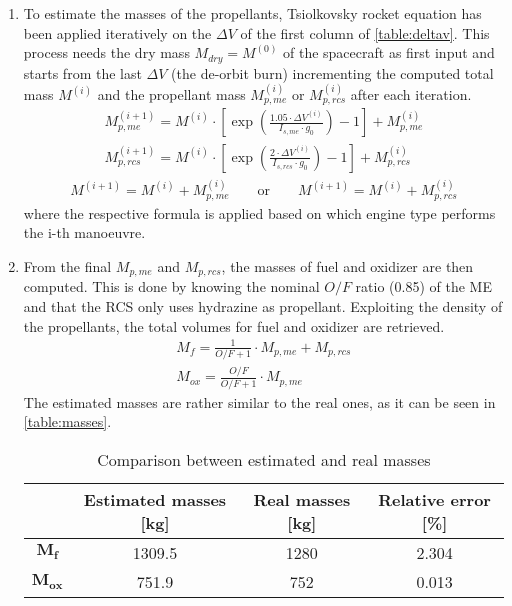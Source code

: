 \begin{enumerate}[itemsep=5mm]
    \item
    To estimate the masses of the propellants, Tsiolkovsky rocket equation has been applied iteratively on the $\Delta V$ of the first column of \autoref{table:deltav}. This process needs the dry mass $M_{dry} = M^{(0)}$ of the spacecraft as first input and starts from the last $\Delta V$ (the de-orbit burn) incrementing the computed total mass $M^{(i)}$ and the propellant mass $M_{p,me}^{(i)}$ or $M_{p,rcs}^{(i)}$ after each iteration.
    \begin{gather}
        M_{p,me}^{(i+1)} = M^{(i)} \cdot \left[ \exp \left( \frac{1.05 \cdot \Delta V^{(i)}} {I_{s,me} \cdot g_0} \right) - 1 \right] + M_{p,me}^{(i)} 
        \label{eq:me_iteration} \\
        M_{p,rcs}^{(i+1)} = M^{(i)} \cdot \left[ \exp \left( \frac{2 \cdot \Delta V^{(i)}} {I_{s,rcs} \cdot g_0} \right) - 1 \right] + M_{p,rcs}^{(i)}
        \label{eq:rcs_iteration}
    \end{gather}
    \begin{gather}
        M^{(i+1)} = M^{(i)} + M_{p,me}^{(i)}
        \qquad \textrm{or} \qquad
        M^{(i+1)} = M^{(i)} + M_{p,rcs}^{(i)}
    \end{gather}
    where the respective formula is applied based on which engine type performs the i-th manoeuvre.
    
    \item
    From the final $M_{p,me}$ and $M_{p,rcs}$, the masses of fuel and oxidizer are then computed. This is done by knowing the nominal $O/F$ ratio (0.85) of the ME \cite{Leros} and that the RCS only uses hydrazine as propellant.
    Exploiting the density of the propellants, the total volumes for fuel and oxidizer are retrieved.
    \begin{gather}
        M_{f} = \frac{1}{O/F + 1} \cdot M_{p,me} + M_{p,rcs} 
        \\
        M_{ox} = \frac{O/F}{O/F + 1} \cdot M_{p,me}
    \end{gather}
    The estimated masses are rather similar to the real ones, as it can be seen in \autoref{table:masses}.

    \begin{table}[H]
        \renewcommand{\arraystretch}{1.3}
        \centering
        \begin{tabular}{|c|c|c|c|}
            \hline
            & \textbf{Estimated masses [kg]} & \textbf{Real masses [kg]} \cite{masses_ref} & \textbf{Relative error [\%]} \\
            \hline
            $\boldsymbol{M_{f}}$ & 1309.5 & 1280 & 2.304 \\
            \hline
            $\boldsymbol{M_{ox}}$ & 751.9 & 752 & 0.013 \\
            \hline
        \end{tabular}
        \caption{Comparison between estimated and real masses}
        \label{table:masses}
    \end{table}


\end{enumerate}
